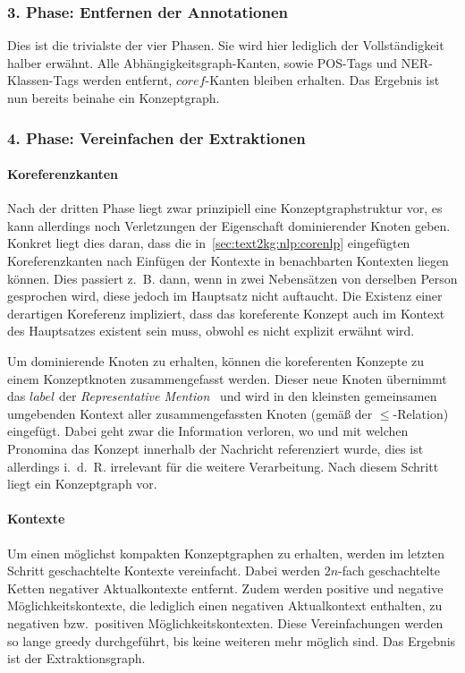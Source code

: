 \subsubsection{3. Phase: Entfernen der Annotationen}

Dies ist die trivialste der vier Phasen.
Sie wird hier lediglich der Vollständigkeit halber erwähnt.
Alle Abhängigkeitsgraph-Kanten, sowie POS-Tags und NER-Klassen-Tags werden entfernt, $\mathit{coref}$-Kanten bleiben erhalten.
Das Ergebnis ist nun bereits beinahe ein Konzeptgraph.

\subsubsection{4. Phase: Vereinfachen der Extraktionen}

\paragraph{Koreferenzkanten}
Nach der dritten Phase liegt zwar prinzipiell eine Konzeptgraphstruktur vor, es kann allerdings noch Verletzungen der Eigenschaft dominierender Knoten geben.
Konkret liegt dies daran, dass die in~\ref{sec:text2kg:nlp:corenlp} eingefügten Koreferenzkanten nach Einfügen der Kontexte in benachbarten Kontexten liegen können.
Dies passiert z.~B. dann, wenn in zwei Nebensätzen von derselben Person gesprochen wird, diese jedoch im Hauptsatz nicht auftaucht.
Die Existenz einer derartigen Koreferenz impliziert, dass das koreferente Konzept auch im Kontext des Hauptsatzes existent sein muss, obwohl es nicht explizit erwähnt wird.

Um dominierende Knoten zu erhalten, können die koreferenten Konzepte zu einem Konzeptknoten zusammengefasst werden.
Dieser neue Knoten übernimmt das $label$ der \textit{Representative Mention}~ und wird in den kleinsten gemeinsamen umgebenden Kontext aller zusammengefassten Knoten (gemäß der $\leq$-Relation) eingefügt.
Dabei geht zwar die Information verloren, wo und mit welchen Pronomina das Konzept innerhalb der Nachricht referenziert wurde, dies ist allerdings i.~d.~R. irrelevant für die weitere Verarbeitung.
Nach diesem Schritt liegt ein Konzeptgraph vor.

\paragraph{Kontexte}
Um einen möglichst kompakten Konzeptgraphen zu erhalten, werden im letzten Schritt geschachtelte Kontexte vereinfacht.
Dabei werden $2n$-fach geschachtelte Ketten negativer Aktualkontexte entfernt.
Zudem werden positive und negative Möglichkeitskontexte, die lediglich einen negativen Aktualkontext enthalten, zu negativen bzw.\ positiven Möglichkeitskontexten.
Diese Vereinfachungen werden so lange greedy durchgeführt, bis keine weiteren mehr möglich sind.
Das Ergebnis ist der Extraktionsgraph.

